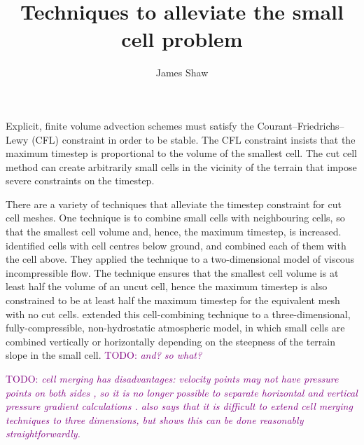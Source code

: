 \documentclass{article}
\title{Techniques to alleviate the small cell problem}
\author{James Shaw}
\newcommand{\TODO}[1]{\textcolor{purple}{TODO: \emph{#1}}}
\begin{document}
\maketitle

Explicit, finite volume advection schemes must satisfy the Courant--Friedrichs--Lewy (CFL) constraint in order to be stable.  The CFL constraint insists that the maximum timestep is proportional to the volume of the smallest cell.  The cut cell method can create arbitrarily small cells in the vicinity of the terrain that impose severe constraints on the timestep.

There are a variety of techniques that alleviate the timestep constraint for cut cell meshes.  One technique is to combine small cells with neighbouring cells, so that the smallest cell volume and, hence, the maximum timestep, is increased.  \citet{ye1999} identified cells with cell centres below ground, and combined each of them with the cell above.  They applied the technique to a two-dimensional model of viscous incompressible flow.  The technique ensures that the smallest cell volume is at least half the volume of an uncut cell, hence the maximum timestep is also constrained to be at least half the maximum timestep for the equivalent mesh with no cut cells.
\citet{yamazaki2016} extended this cell-combining technique to a three-dimensional, fully-compressible, non-hydrostatic atmospheric model, in which small cells are combined vertically or horizontally depending on the steepness of the terrain slope in the small cell.  \TODO{and? so what?}

\TODO{cell merging has disadvantages: velocity points may not have pressure points on both sides \citep{kirkpatrick2003}, so it is no longer possible to separate horizontal and vertical pressure gradient calculations \citep{walko-avissar2008b}.  \citet{kirkpatrick2003} also says that it is difficult to extend cell merging techniques to three dimensions, but \citet{yamazaki2016} shows this can be done reasonably straightforwardly.}



\end{document}
